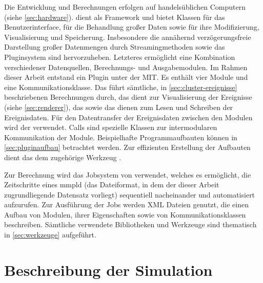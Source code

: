 Die Entwicklung und Berechnungen erfolgen auf handelsüblichen Computern (siehe \autoref{sec:hardware}).  dient als Framework und bietet Klassen für das Benutzerinterface, für die Behandlung großer Daten sowie für ihre Modifizierung, Visualisierung und Speicherung. Insbesondere die annähernd verzögerungsfreie Darstellung großer Datenmengen durch Streamingmethoden sowie das Pluginsystem sind hervorzuheben. Letzteres ermöglicht eine Kombination verschiedener Datenquellen, Berechnungs- und Ausgabemodulen. Im Rahmen dieser Arbeit entstand ein Plugin unter der \gls{MIT}. Es enthält vier Module und eine Kommunikationsklasse. Das  führt sämtliche, in \autoref{sec:cluster-ereignisse} beschriebenen Berechnungen durch, das  dient zur Visualisierung der Ereignisse (siehe \autoref{sec:renderer}), das  sowie das  dienen zum Lesen und Schreiben der Ereignisdaten. Für den Datentransfer der Ereignisdaten zwischen den Modulen wird der  verwendet. Calls sind spezielle Klassen zur intermodularen Kommunikation der  Module. Beispielhafte Programmaufbauten können in \autoref{sec:pluginaufbau} betrachtet werden. Zur effizienten Erstellung der Aufbauten dient das dem  zugehörige Werkzeug .

Zur Berechnung wird das Jobsystem von  verwendet, welches es ermöglicht, die Zeitschritte eines \gls{mmpld} (das Dateiformat, in dem der dieser Arbeit zugrundliegende Datensatz vorliegt) sequentiell nacheinander und automatisiert aufzurufen. Zur Ausführung der Jobs werden \gls{XML} Dateien genutzt, die einen Aufbau von Modulen, ihrer Eigenschaften sowie von Kommunikationsklassen beschreiben. Sämtliche verwendete Bibliotheken und Werkzeuge sind thematisch in \autoref{sec:werkzeuge} aufgeführt.



\section{Beschreibung der Simulation}\label{sec:simulation}

